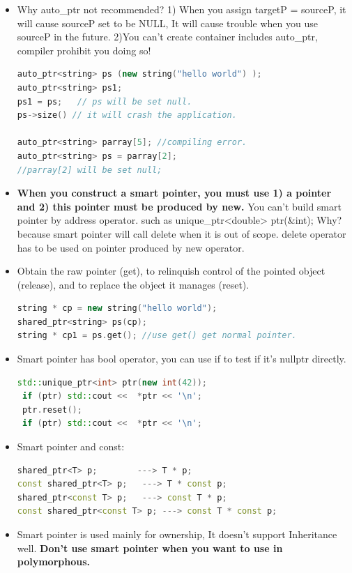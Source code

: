 \documentclass[a4paper,12pt,twoside]{book}
\begin{document}
\begin{itemize}
\item Why auto\_ptr not recommended? 1) When you assign targetP = sourceP, it will cause sourceP set to be NULL, It will cause trouble when you use sourceP in the future.  2)You can't create container includes auto\_ptr, compiler prohibit you doing so!
\begin{lstlisting}[frame=single, language=c++]
auto_ptr<string> ps (new string("hello world") );
auto_ptr<string> ps1;
ps1 = ps;   // ps will be set null.
ps->size() // it will crash the application.

auto_ptr<string> parray[5]; //compiling error.
auto_ptr<string> ps = parray[2];
//parray[2] will be set null;
\end{lstlisting}

\item \textbf{When you construct a smart pointer, you must use 1) a pointer and 2) this pointer must be produced by new.} You can't build smart pointer by address operator. such as unique\_ptr<double> ptr(\&int);   Why? because smart pointer will call delete when it is out of scope.  delete operator has to be used on pointer produced by new operator.

\item Obtain the raw pointer (get), to relinquish control of the pointed object (release), and to replace the object it manages (reset).
\begin{lstlisting}[frame=single, language=c++]
string * cp = new string("hello world");
shared_ptr<string> ps(cp);
string * cp1 = ps.get(); //use get() get normal pointer.
\end{lstlisting}


\item Smart pointer has bool operator, you can use if to test if it's nullptr directly.
\begin{lstlisting}[frame=single, language=c++]
 std::unique_ptr<int> ptr(new int(42));
 if (ptr) std::cout <<  *ptr << '\n';
 ptr.reset();
 if (ptr) std::cout <<  *ptr << '\n';
\end{lstlisting}

\item Smart pointer and const:
\begin{lstlisting}[frame=single, language=c++]
shared_ptr<T> p;        ---> T * p;
const shared_ptr<T> p;   ---> T * const p;
shared_ptr<const T> p;   ---> const T * p;
const shared_ptr<const T> p; ---> const T * const p;
\end{lstlisting}

\item Smart pointer is used mainly for ownership, It doesn't support Inheritance well.
 \textbf{Don't use smart pointer when you want to use in polymorphous.}

\end{itemize}
\end{document}
